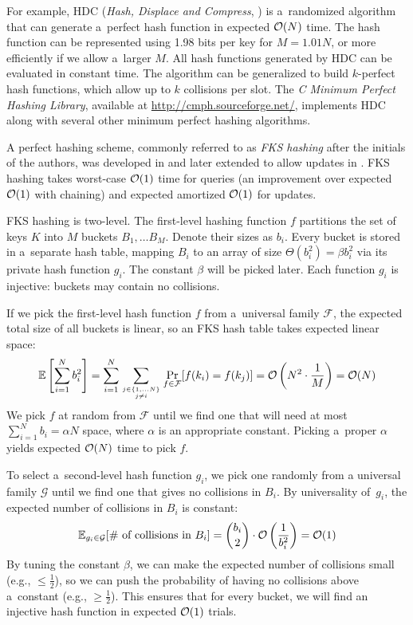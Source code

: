 For example, HDC (\textit{Hash, Displace and Compress},
\cite{hdc-hashing}) is a~randomized algorithm that can generate a~perfect
hash function in expected $\mathcal{O}(N)$ time. The hash function can be represented
using 1.98 bits per key for $M=1.01 N$, or more efficiently if we allow a~larger
$M$. All hash functions generated by HDC can be evaluated in constant time.
The algorithm can be generalized to build $k$-perfect hash functions, which
allow up to $k$ collisions per slot. The \textit{C Minimum Perfect
Hashing Library}, available at \url{http://cmph.sourceforge.net/}, implements
HDC along with several other minimum perfect hashing algorithms.

A perfect hashing scheme, commonly referred to as \emph{FKS hashing}
after the initials of the authors, was developed in \cite{fks-hashing}
and later extended to allow updates in \cite{dyn-ph-bounds}.
FKS hashing takes worst-case $\mathcal{O}(1)$ time for queries (an improvement over
expected $\mathcal{O}(1)$ with chaining) and expected amortized $\mathcal{O}(1)$ for updates.

FKS hashing is two-level. The first-level hashing function $f$ partitions
the set of keys $K$ into $M$ buckets $B_1,\ldots B_M$. Denote their sizes as
$b_i$.
Every bucket is stored in a~separate hash table, mapping $B_i$ to an array
of size $\Theta(b_i^2)=\beta b_i^2$ via its private hash function $g_i$.
The constant $\beta$ will be picked later.
Each function $g_i$ is injective: buckets may contain no collisions.

If we pick the first-level hash function $f$ from a~universal family
$\mathcal{F}$, the expected total size of all buckets is linear, so an FKS
hash table takes expected linear space:
$$\mathbb{E}\left[\sum_{i=1}^N b_i^2\right]=
	\sum_{i=1}^N \sum_{j\in\{1,\ldots N\} \atop j\neq i}
	\Pr_{f\in\mathcal{F}}[f(k_i)=f(k_j)]=
	\mathcal{O}\left(N^2\cdot\frac{1}{M}\right)=\mathcal{O}(N)$$
We pick $f$ at random from $\mathcal{F}$ until we find one that will need at
most $\sum_{i=1}^N b_i=\alpha N$ space, where $\alpha$ is an appropriate
constant. Picking a~proper $\alpha$ yields expected $\mathcal{O}(N)$ time to pick $f$.

To select a~second-level hash function $g_i$, we pick one randomly from
a universal family $\mathcal{G}$ until we find one that gives no collisions
in $B_i$. By universality of~$g_i$, the expected number of collisions in $B_i$
is constant:
$$\mathbb{E}_{g_i\in\mathcal{G}}[\text{\# of collisions in }B_i]=
	{b_i\choose 2}\cdot\mathcal{O}\left(\frac{1}{b_i^2}\right)=\mathcal{O}(1)$$
By tuning the constant $\beta$, we can make the expected number of collisions
small (e.g., $\leq\frac{1}{2}$), so we can push the probability of having no
collisions above a~constant (e.g., $\geq\frac{1}{2}$). This ensures that for
every bucket, we will find an injective hash function in expected $\mathcal{O}(1)$
trials.

